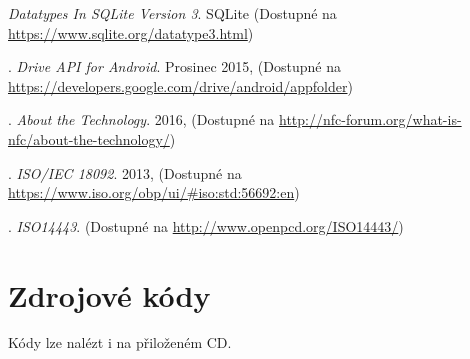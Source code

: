 \documentclass{article}
\begin{document}
\begin{thebibliography}{99}
\textit{Datatypes In SQLite Version 3}. {SQLite
\newline(Dostupné na \url{https://www.sqlite.org/datatype3.html})}



.
\textit{Drive API for Android}. {Prosinec 2015,
\newline(Dostupné na \url{https://developers.google.com/drive/android/appfolder})}

.
\textit{About the Technology}. {2016,
\newline(Dostupné na \url{http://nfc-forum.org/what-is-nfc/about-the-technology/})}

.
\textit{ISO/IEC 18092}. {2013,
\newline(Dostupné na \url{https://www.iso.org/obp/ui/#iso:std:56692:en})}


.
\textit{ISO14443}. {
\newline(Dostupné na \url{http://www.openpcd.org/ISO14443/})}

\end{thebibliography}

  \appendix

  \section{Zdrojové kódy}
  Kódy lze nalézt i na přiloženém CD.
\end{document}
